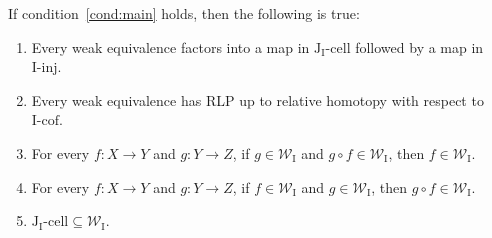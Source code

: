 \documentclass{tac}
\theoremstyle{definition}
\newcommand{\we}{\mathcal{W}}
\newcommand{\I}{\mathrm{I}}
\newcommand{\J}{\mathrm{J}}
\newcommand{\class}[2]{#1\text{-}\mathrm{#2}}
\newcommand{\Iinj}[1][\I]{\class{#1}{inj}}
\newcommand{\Icell}[1][\I]{\class{#1}{cell}}
\newcommand{\Icof}[1][\I]{\class{#1}{cof}}
\newcommand{\Jcell}[1][]{\Icell[\J#1]}
\begin{document}
\begin{lem}[main]
If condition~\eqref{cond:main} holds, then the following is true:
\begin{enumerate}
\item Every weak equivalence factors into a map in $\Jcell[_\I]$ followed by a map in $\Iinj$.
\item Every weak equivalence has RLP up to relative homotopy with respect to $\Icof$.
\item \label{it:we-top} For every $f : X \to Y$ and $g : Y \to Z$, if $g \in \we_\I$ and $g \circ f \in \we_\I$, then $f \in \we_\I$.
\item For every $f : X \to Y$ and $g : Y \to Z$, if $f \in \we_\I$ and $g \in \we_\I$, then $g \circ f \in \we_\I$.
\item $\Jcell[_\I] \subseteq \we_\I$.
\end{enumerate}
\end{lem}
\end{document}
